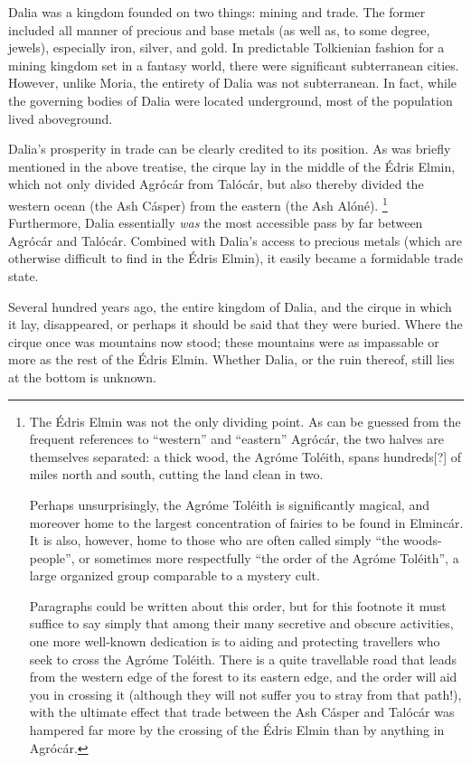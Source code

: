 \documentclass{article}
\let\oldthefootnote\thefootnote
\newcommand\oocfootnote[2][DarkGreen]{\renewcommand\thefootnote{\color{#1}\oldthefootnote}%
  \footnote{\color{#1}#2}%
  \renewcommand{\thefootnote}{\oldthefootnote}}
\begin{document}
Dalia was a kingdom founded on two things: mining and trade. The former included all manner of precious and base metals (as well as, to some degree, jewels), especially iron, silver, and gold. In predictable Tolkienian fashion for a mining kingdom set in a fantasy world, there were significant subterranean cities. However, unlike Moria, the entirety of Dalia was not subterranean. In fact, while the governing bodies of Dalia were located underground, most of the population lived aboveground.

Dalia's prosperity in trade can be clearly credited to its position.  As was briefly mentioned in the above treatise, the cirque lay in the middle of the Édris Elmin, which not only divided Agrócár from Talócár, but also thereby divided the western ocean (the Ash Cásper) from the eastern (the Ash Alóné).\oocfootnote{The Édris Elmin was not the only dividing point. As can be guessed from the frequent references to ``western'' and ``eastern'' Agrócár, the two halves are themselves separated: a thick wood, the Agróme Toléith, spans hundreds[?] of miles north and south, cutting the land clean in two. \par Perhaps unsurprisingly, the Agróme Toléith is significantly magical, and moreover home to the largest concentration of fairies to be found in Elmincár. It is also, however, home to those who are often called simply ``the woods-people'', or sometimes more respectfully ``the order of the Agróme Toléith'', a large organized group comparable to a mystery cult. \par Paragraphs could be written about this order, but for this footnote it must suffice to say simply that among their many secretive and obscure activities, one more well-known dedication is to aiding and protecting travellers who seek to cross the Agróme Toléith. There is a quite travellable road that leads from the western edge of the forest to its eastern edge, and the order will aid you in crossing it (although they will not suffer you to stray from that path!), with the ultimate effect that trade between the Ash Cásper and Talócár was hampered far more by the crossing of the Édris Elmin than by anything in Agrócár.} Furthermore, Dalia essentially \emph{was} the most accessible pass by far between Agrócár and Talócár. Combined with Dalia's access to precious metals (which are otherwise difficult to find in the Édris Elmin), it easily became a formidable trade state.

Several hundred years ago, the entire kingdom of Dalia, and the cirque in which it lay, disappeared, or perhaps it should be said that they were buried. Where the cirque once was mountains now stood; these mountains were as impassable or more as the rest of the Édris Elmin. Whether Dalia, or the ruin thereof, still lies at the bottom is unknown.
\end{document}
